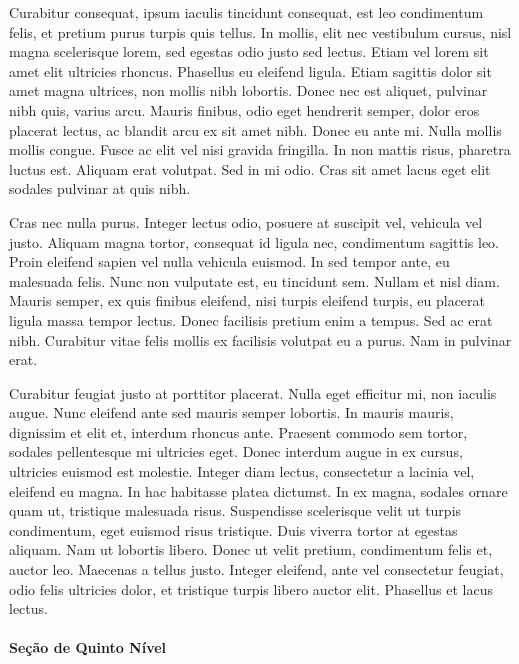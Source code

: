 				Curabitur consequat, ipsum iaculis tincidunt consequat, est leo condimentum felis, et pretium purus turpis quis tellus. In mollis, elit nec vestibulum cursus, nisl magna scelerisque lorem, sed egestas odio justo sed lectus. Etiam vel lorem sit amet elit ultricies rhoncus. Phasellus eu eleifend ligula. Etiam sagittis dolor sit amet magna ultrices, non mollis nibh lobortis. Donec nec est aliquet, pulvinar nibh quis, varius arcu. Mauris finibus, odio eget hendrerit semper, dolor eros placerat lectus, ac blandit arcu ex sit amet nibh. Donec eu ante mi. Nulla mollis mollis congue. Fusce ac elit vel nisi gravida fringilla. In non mattis risus, pharetra luctus est. Aliquam erat volutpat. Sed in mi odio. Cras sit amet lacus eget elit sodales pulvinar at quis nibh.

				Cras nec nulla purus. Integer lectus odio, posuere at suscipit vel, vehicula vel justo. Aliquam magna tortor, consequat id ligula nec, condimentum sagittis leo. Proin eleifend sapien vel nulla vehicula euismod. In sed tempor ante, eu malesuada felis. Nunc non vulputate est, eu tincidunt sem. Nullam et nisl diam. Mauris semper, ex quis finibus eleifend, nisi turpis eleifend turpis, eu placerat ligula massa tempor lectus. Donec facilisis pretium enim a tempus. Sed ac erat nibh. Curabitur vitae felis mollis ex facilisis volutpat eu a purus. Nam in pulvinar erat.

				Curabitur feugiat justo at porttitor placerat. Nulla eget efficitur mi, non iaculis augue. Nunc eleifend ante sed mauris semper lobortis. In mauris mauris, dignissim et elit et, interdum rhoncus ante. Praesent commodo sem tortor, sodales pellentesque mi ultricies eget. Donec interdum augue in ex cursus, ultricies euismod est molestie. Integer diam lectus, consectetur a lacinia vel, eleifend eu magna. In hac habitasse platea dictumst. In ex magna, sodales ornare quam ut, tristique malesuada risus. Suspendisse scelerisque velit ut turpis condimentum, eget euismod risus tristique. Duis viverra tortor at egestas aliquam. Nam ut lobortis libero. Donec ut velit pretium, condimentum felis et, auctor leo. Maecenas a tellus justo. Integer eleifend, ante vel consectetur feugiat, odio felis ultricies dolor, et tristique turpis libero auctor elit. Phasellus et lacus lectus. 
				
				\paragraph{\esp Seção de Quinto Nível}\label{section:1.1.1.1.1}
				
